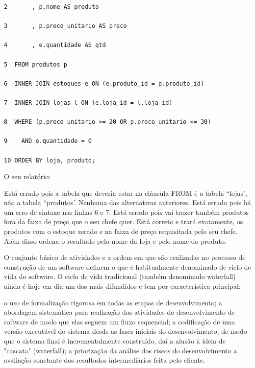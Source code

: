 \documentclass[12pt, addpoints]{exam}
\begin{document}
\begin{questions}
\begin{tcolorbox}
\begin{verbatim}
2       , p.nome AS produto

3       , p.preco_unitario AS preco

4       , e.quantidade AS qtd

5  FROM produtos p

6  INNER JOIN estoques e ON (e.produto_id = p.produto_id)

7  INNER JOIN lojas l ON (e.loja_id = l.loja_id)

8  WHERE (p.preco_unitario >= 20 OR p.preco_unitario <= 30)

9    AND e.quantidade = 0

10 ORDER BY loja, produto;

 \end{verbatim}

\end{tcolorbox}

O seu relatório:
\begin{choices}
\choice Está errado pois a tabela que deveria estar na cláusula FROM é a tabela ``lojas', não a tabela ``produtos'.
\choice Nenhuma das alternativas anteriores.
\choice Está errado pois há um erro de sintaxe nas linhas 6 e 7.
\choice Está errado pois vai trazer também produtos fora da faixa de preço que o seu chefe quer.
\choice Está correto e trará exatamente, os produtos com o estoque zerado e na faixa de preço requisitada pelo seu chefe. Além disso ordena o resultado pelo nome da loja e pelo nome do produto.
\end{choices}

\question

O conjunto básico de atividades e a ordem em que são realizadas no processo de construção de um software definem o que é habitualmente denominado de ciclo de vida do software. O ciclo de vida tradicional (também denominado waterfall) ainda é hoje em dia um dos mais difundidos e tem por característica principal: 
\begin{choices}
\choice o uso de formalização rigorosa em todas as etapas de desenvolvimento; 
\choice a abordagem sistemática para realização das atividades do desenvolvimento de software de modo que elas seguem um fluxo sequencial; 
\choice a codificação de uma versão executável do sistema desde as fases iniciais do desenvolvimento, de modo que o sistema final é incrementalmente construído, daí a alusão à ideia de "cascata" (waterfall); 
\choice a priorização da análise dos riscos do desenvolvimento
\choice a avaliação constante dos resultados intermediários feita pelo cliente.
\end{choices}


\end{questions}
\end{document}
